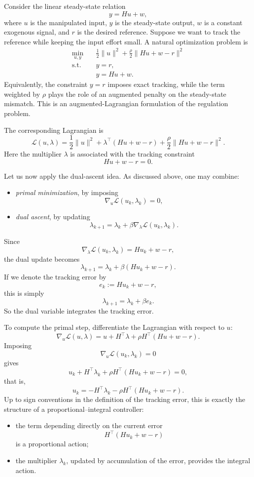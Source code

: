 Consider the linear steady-state relation
\[
y=Hu+w,
\]
where $u$ is the manipulated input, $y$ is the steady-state output, $w$ is a constant exogenous signal, and $r$ is the desired reference. Suppose we want to track the reference while keeping the input effort small. A natural optimization problem is
\[
\begin{aligned}
\min_{u,y}\quad & \frac{1}{2}\|u\|^2+\frac{\rho}{2}\|Hu+w-r\|^2\\
\text{s.t.}\quad & y=r,\\
& y=Hu+w.
\end{aligned}
\]
Equivalently, the constraint $y=r$ imposes exact tracking, while the term weighted by $\rho$ plays the role of an augmented penalty on the steady-state mismatch. This is an augmented-Lagrangian formulation of the regulation problem.

The corresponding Lagrangian is
\[
\mathcal L(u,\lambda)
=
\frac{1}{2}\|u\|^2
+
\lambda^\top(Hu+w-r)
+
\frac{\rho}{2}\|Hu+w-r\|^2.
\]
Here the multiplier $\lambda$ is associated with the tracking constraint
\[
Hu+w-r=0.
\]

Let us now apply the dual-ascent idea. As discussed above, one may combine:
\begin{itemize}
    \item \emph{primal minimization}, by imposing
    \[
    \nabla_u \mathcal L(u_k,\lambda_k)=0,
    \]
    \item \emph{dual ascent}, by updating
    \[
    \lambda_{k+1}=\lambda_k+\beta \nabla_\lambda \mathcal L(u_k,\lambda_k).
    \]
\end{itemize}
Since
\[
\nabla_\lambda \mathcal L(u_k,\lambda_k)=Hu_k+w-r,
\]
the dual update becomes
\[
\lambda_{k+1}=\lambda_k+\beta(Hu_k+w-r).
\]
If we denote the tracking error by
\[
e_k:=Hu_k+w-r,
\]
this is simply
\[
\lambda_{k+1}=\lambda_k+\beta e_k.
\]
So the dual variable integrates the tracking error.

To compute the primal step, differentiate the Lagrangian with respect to $u$:
\[
\nabla_u \mathcal L(u,\lambda)
=
u+H^\top\lambda+\rho H^\top(Hu+w-r).
\]
Imposing
\[
\nabla_u \mathcal L(u_k,\lambda_k)=0
\]
gives
\[
u_k+H^\top\lambda_k+\rho H^\top(Hu_k+w-r)=0,
\]
that is,
\[
u_k=-H^\top\lambda_k-\rho H^\top(Hu_k+w-r).
\]
Up to sign conventions in the definition of the tracking error, this is exactly the structure of a proportional--integral controller:
\begin{itemize}
    \item the term depending directly on the current error
    \[
    H^\top(Hu_k+w-r)
    \]
    is a proportional action;
    \item the multiplier $\lambda_k$, updated by accumulation of the error, provides the integral action.
\end{itemize}

